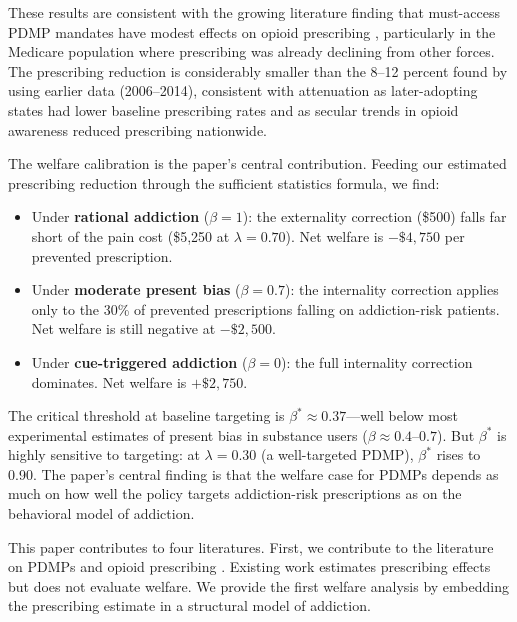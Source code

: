 \documentclass[12pt]{article}
\begin{document}
These results are consistent with the growing literature finding that must-access PDMP mandates have modest effects on opioid prescribing \citep{kaestner2019effects, horwitz2021effect, dave2021mandatory}, particularly in the Medicare population where prescribing was already declining from other forces. The prescribing reduction is considerably smaller than the 8--12 percent found by \citet{buchmueller2018effect} using earlier data (2006--2014), consistent with attenuation as later-adopting states had lower baseline prescribing rates and as secular trends in opioid awareness reduced prescribing nationwide.

The welfare calibration is the paper's central contribution. Feeding our estimated prescribing reduction through the sufficient statistics formula, we find:

\begin{itemize}
\item Under \textbf{rational addiction} ($\beta = 1$): the externality correction (\$500) falls far short of the pain cost (\$5,250 at $\lambda = 0.70$). Net welfare is $-\$4{,}750$ per prevented prescription.
\item Under \textbf{moderate present bias} ($\beta = 0.7$): the internality correction applies only to the 30\% of prevented prescriptions falling on addiction-risk patients. Net welfare is still negative at $-\$2{,}500$.
\item Under \textbf{cue-triggered addiction} ($\beta = 0$): the full internality correction dominates. Net welfare is $+\$2{,}750$.
\end{itemize}

The critical threshold at baseline targeting is $\beta^* \approx 0.37$---well below most experimental estimates of present bias in substance users ($\beta \approx 0.4$--$0.7$). But $\beta^*$ is highly sensitive to targeting: at $\lambda = 0.30$ (a well-targeted PDMP), $\beta^*$ rises to 0.90. The paper's central finding is that the welfare case for PDMPs depends as much on how well the policy targets addiction-risk prescriptions as on the behavioral model of addiction.

This paper contributes to four literatures. First, we contribute to the literature on PDMPs and opioid prescribing \citep{buchmueller2018effect, kaestner2019effects, horwitz2021effect, dave2021mandatory, meinhofer2018prescribing, maclean2022prescription}. Existing work estimates prescribing effects but does not evaluate welfare. We provide the first welfare analysis by embedding the prescribing estimate in a structural model of addiction.
\end{document}
